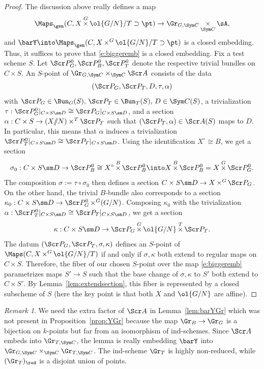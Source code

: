 \documentclass[final]{amsart}
\theoremstyle{remark}
\newtheorem{rem}[subsubsection]{Remark}
\theoremstyle{definition}
\DeclareMathOperator*{\xt}{\times}
\numberwithin{equation}{section}
\begin{document}
\begin{proof}
The discussion above really defines a map 
\begin{equation} \label{e:biggeremb}
    \Maps_\gen(C, X \xt^G \ol{G/N}/T \supset \pt) \to \Gr_{G,\Sym C} \xt_{\Sym C} \sA, 
\end{equation}
and $\barY \into \Maps_\gen(C, X\xt^G \ol{G/N}/T \supset \pt)$ is a closed
embedding. Thus, it suffices to prove that \eqref{e:biggeremb} is a closed
embedding.  
Fix a test scheme $S$. 
Let $\Scr P^0_G,\Scr P^0_B,\Scr P^0_T$ denote the respective trivial bundles on $C\times S$. 
An $S$-point of $\Gr_{G,\Sym C} \times_{\Sym C} \Scr A$
consists of the data 
\[ (\Scr P_G,\Scr P_T,D,\tau,\alpha)  \]
with $\Scr P_G\in \Bun_G(S),\, \Scr P_T \in \Bun_T(S),\, D\in \Sym C(S)$,
a trivialization $\tau : \Scr P^0_G|_{C\times S\sm D}\cong \Scr P_G|_{C\times S\sm D}$, 
and a section
$\alpha: C\times S \to (X/\!\!/N)\times^T \Scr P_T$ such that 
$(\Scr P_T,\alpha) \in \Scr A(S)$ maps to $D$. 
In particular, this means that $\alpha$ induces a trivialization 
$\Scr P_T^0|_{C\times S\sm D} \cong \Scr P_T|_{C\times S\sm D}$. 
Using the identification $X^\circ \cong B$, we get a section
\[ \sigma_0 : C\times S\sm D \to \Scr P^0_B \cong X^\circ \xt^B \Scr P_B^0 
\into X \xt^B \Scr P_B^0= X \xt^G \Scr P_G^0. \]
The composition $\sigma := \tau \circ \sigma_0$ then defines a section
$C\times S \sm D \to X\xt^G \Scr P_G$.
On the other hand, the trivial $B$-bundle also corresponds to a section
$\kappa_0 : C\times S \sm D \to \Scr P_G^0 \xt^G (G/N)$.
Composing $\kappa_0$ with the trivialization $\alpha:\Scr P_T^0|_{C\times S\sm D} \cong \Scr P_T|_{C\times S\sm D}$, we get a section
\[ \kappa : C\times S \sm D \to \Scr P_G \xt^G \ol{G/N} \xt^T \Scr P_T. \]
The datum $(\Scr P_G, \Scr P_T, \sigma, \kappa)$ defines an $S$-point 
of $\Maps(C, X\xt^G \ol{G/N}/T)$ if and only if $\sigma,\kappa$ both extend to regular
maps on $C\times S$. 
Therefore, the fiber of our chosen $S$-point over 
the map \eqref{e:biggeremb}
parametrizes maps $S' \to S$
such that the base change of $\sigma,\kappa$ to $S'$ both extend to 
$C\times S'$. By Lemma~\ref{lem:extendsection}, 
this fiber is represented by a closed subscheme of $S$ (here the key point 
is that both $X$ and $\ol{G/N}$ are affine). 
\end{proof}

\begin{rem}
We need the extra factor of $\Scr A$ in Lemma~\ref{lem:barYGr} which was
not present in Proposition~\ref{prop:YGr} because the map $\Gr_B \to \Gr_G$
is a bijection on $k$-points but far from an isomorphism of ind-schemes. 
Since $\Scr A$ embeds into $\Gr_{T,\Sym C}$, the lemma is really
embedding $\barY$ into $\Gr_{G,\Sym C}\times_{\Sym C} \Gr_{T,\Sym C}$. 
The ind-scheme $\Gr_T$ is highly non-reduced, while $(\Gr_T)_\red$ is a disjoint
union of points.
\end{rem}
\end{document}

